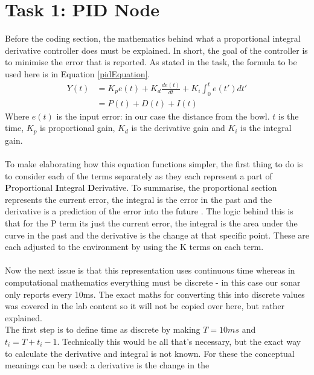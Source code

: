 \documentclass{article}
\newcommand\tab[1][1cm]{\hspace*{#1}}
\begin{document}
\newpage
\section{Task 1: PID Node}\label{pidSection}
Before the coding section, the mathematics behind what a proportional integral
derivative controller does must be explained. In short, the goal of the
controller is to minimise the error that is reported. As stated in the task, the
formula to be used here is in Equation \ref{pidEquation}.
\begin{equation}
    \label{pidEquation}
    \begin{split}
    Y(t) & = K_{p}e(t) + 
           K_{d}\frac{de(t)}{dt} +
           K_{i}\int^{t}_{0}e(t')dt' \\
    & = P(t) + D(t) + I(t)
    \end{split}
\end{equation}
\tab Where $e(t)$ is the input error: in our case the distance from the bowl.
$t$ is the time, $K_p$ is proportional gain, $K_d$ is the derivative gain and
$K_i$ is the integral gain. \\ \\
To make elaborating how this equation functions simpler, the first thing to
do is to consider each of the terms separately as they each represent a part of
\textbf{P}roportional \textbf{I}ntegral \textbf{D}erivative. To summarise, the
proportional section represents the current error, the integral is the error in the
past and the derivative is a prediction of the error into the future
\cite{pidControl}. The logic behind this is that for the P term its just the
current error, the integral is the area under the curve in the past and the
derivative is the change at that specific point.
These are each adjusted to the environment by using the K
terms on each term.  \\ \\
Now the next issue is that this representation uses continuous time whereas in
computational mathematics everything must be discrete - in this case our sonar
only reports every 10ms. The exact maths for converting this into discrete
values was covered in the lab content so it will not be copied over here, but
rather explained. \\
\tab The first step is to define time as discrete by making $T=10ms$ and 
$t_i = T+t_i-1$. Technically this would be all that's necessary, but the exact
way to calculate the derivative and integral is not known. For these the
conceptual meanings can be used: a derivative is the change in the 
\end{document}

